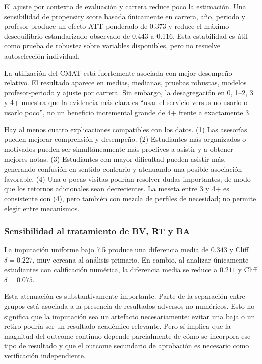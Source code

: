 \documentclass[11pt,letterpaper]{article}
\begin{document}
El ajuste por contexto de evaluación y carrera reduce poco la estimación. Una sensibilidad de propensity score basada únicamente en carrera, año, periodo y profesor produce un efecto ATT ponderado de $0.373$ y reduce el máximo desequilibrio estandarizado observado de 0.443 a 0.116. Esta estabilidad es útil como prueba de robustez sobre variables disponibles, pero no resuelve autoselección individual.

\begin{answerbox}
La utilización del CMAT está fuertemente asociada con mejor desempeño relativo. El resultado aparece en medias, medianas, pruebas robustas, modelos profesor-periodo y ajuste por carrera. Sin embargo, la desagregación en 0, 1--2, 3 y 4+ muestra que la evidencia más clara es ``usar el servicio versus no usarlo o usarlo poco'', no un beneficio incremental grande de 4+ frente a exactamente 3.
\end{answerbox}

\begin{interpretbox}
Hay al menos cuatro explicaciones compatibles con los datos. (1) Las asesorías pueden mejorar comprensión y desempeño. (2) Estudiantes más organizados o motivados pueden ser simultáneamente más proclives a asistir y a obtener mejores notas. (3) Estudiantes con mayor dificultad pueden asistir más, generando confusión en sentido contrario y atenuando una posible asociación favorable. (4) Una o pocas visitas podrían resolver dudas importantes, de modo que los retornos adicionales sean decrecientes. La meseta entre 3 y 4+ es consistente con (4), pero también con mezcla de perfiles de necesidad; no permite elegir entre mecanismos.
\end{interpretbox}

\subsubsection{Sensibilidad al tratamiento de BV, RT y BA}

La imputación uniforme bajo 7.5 produce una diferencia media de $0.343$ y Cliff $\delta=0.227$, muy cercana al análisis primario. En cambio, al analizar únicamente estudiantes con calificación numérica, la diferencia media se reduce a $0.211$ y Cliff $\delta=0.075$.

Esta atenuación es substantivamente importante. Parte de la separación entre grupos está asociada a la presencia de resultados adversos no numéricos. Esto no significa que la imputación sea un artefacto necesariamente: evitar una baja o un retiro podría ser un resultado académico relevante. Pero sí implica que la magnitud del outcome continuo depende parcialmente de cómo se incorpora ese tipo de resultado y que el outcome secundario de aprobación es necesario como verificación independiente.
\end{document}
